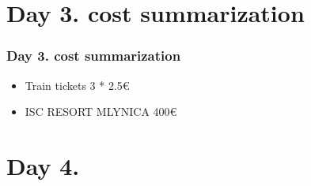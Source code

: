 \documentclass{beamer}
\begin{document}
\begin{frame}
	\end{frame}
	
	\section{Day 3. cost summarization}
	\begin{frame}
		\frametitle{Day 3. cost summarization}

		\begin{itemize}
			\item Train tickets 3 * 2.5€
			\item ISC RESORT MLYNICA 400€
		\end{itemize}
	\end{frame}

	\section{Day 4.}
\end{document}

